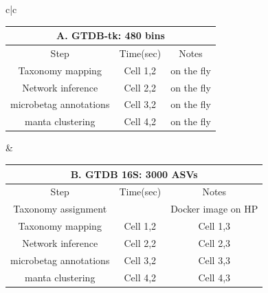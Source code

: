 \documentclass[sn-mathphys,Numbered]{sn-jnl}%
\theoremstyle{thmstyleone}%
\theoremstyle{thmstyletwo}%
\theoremstyle{thmstylethree}%
\begin{document}
    \begin{table}[ht]

        \centering

        \begin{adjustbox}{width=1.3\textwidth,center=\textwidth}

        \begin{tabular}{c|c}

            \begin{tabular}{ccc}

                \multicolumn{3}{c}{A. GTDB-tk: 480 bins} \\
                \toprule
                Step &  Time(sec) & Notes \\
                \toprule

                Taxonomy mapping & Cell 1,2 & on the fly \\

                Network inference & Cell 2,2 & on the fly  \\

                microbetag annotations & Cell 3,2 & on the fly \\

                manta clustering & Cell 4,2 & on the fly \\

            \end{tabular} &

            \begin{tabular}{ccc}

                \multicolumn{3}{c}{B. GTDB 16S: 3000 ASVs} \\
                \toprule
                Step &  Time(sec) & Notes \\
                \toprule

                Taxonomy assignment &  & Docker image on HP\protect\footnotemark \\

                Taxonomy mapping & Cell 1,2 & Cell 1,3 \\

                Network inference & Cell 2,2 & Cell 2,3 \\

                microbetag annotations & Cell 3,2 & Cell 3,3 \\

                manta clustering & Cell 4,2 & Cell 4,3 \\


\end{tabular}
\end{tabular}
\end{adjustbox}
\end{table}
\end{document}
